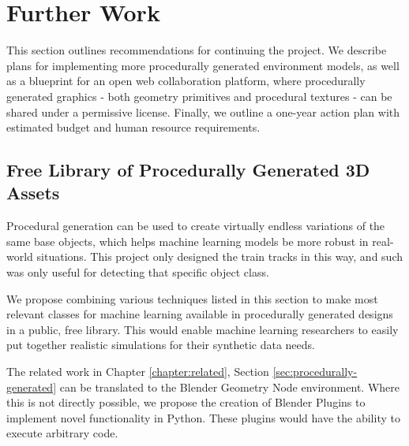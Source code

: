 \chapter{Further Work}
\label{chapter:further-work}


This section outlines recommendations for continuing the project. We describe plans for implementing more procedurally generated environment models, as well as a blueprint for an open web collaboration platform, where procedurally generated graphics - both geometry primitives and procedural textures - can be shared under a permissive license.  Finally, we outline a one-year action plan with estimated budget and human resource requirements.

\section{Free Library of Procedurally Generated 3D Assets}
\label{sec:future-proc-gen-obj}

Procedural generation can be used to create virtually endless variations of the same base objects, which helps machine learning models be more robust in real-world situations. This project only designed the train tracks in this way, and such was only useful for detecting that specific object class.

We propose combining various techniques listed in this section to make most relevant classes for machine learning available in procedurally generated designs in a public, free library. This would enable machine learning researchers to easily put together realistic simulations for their synthetic data needs.

The related work in Chapter \ref{chapter:related}, Section \ref{sec:procedurally-generated} can be translated to the Blender Geometry Node environment. Where this is not directly possible, we propose the creation of Blender Plugins to implement novel functionality in Python. These plugins would have the ability to execute arbitrary code.

